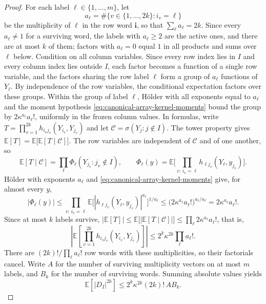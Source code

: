 \documentclass[11pt,reqno]{amsart}
\numberwithin{equation}{section}
\theoremstyle{plain}
\theoremstyle{definition}
\newcommand{\E}{\mathbb E}
\begin{document}
\begin{proof}
For each label $\ell\in\{1,\ldots,m\}$, let
\begin{equation}
 a_\ell=\#\{v\in\{1,\ldots,2k\}:i_v=\ell\}
 \label{eq:row-multiplicity}
\end{equation}
be the multiplicity of $\ell$ in the row word $\mathbf i$, so that $\sum_\ell a_\ell=2k$.  Since every $a_\ell\ne1$ for a surviving word, the labels with $a_\ell\ge2$ are the active ones, and there are at most $k$ of them; factors with $a_\ell=0$ equal $1$ in all products and sums over $\ell$ below.  Condition on all column variables.  Since every row index lies in $I$ and every column index lies outside $I$, each factor becomes a function of a single row variable, and the factors sharing the row label $\ell$ form a group of $a_\ell$ functions of $Y_\ell$.  By independence of the row variables, the conditional expectation factors over these groups.  Within the group of label $\ell$, H\"older with all exponents equal to $a_\ell$ and the moment hypothesis \eqref{eq:canonical-array-kernel-moments} bound the group by $2\kappa^{a_\ell}a_\ell!$, uniformly in the frozen column values.  In formulas, write $T=\prod_{v=1}^{2k}h_{i_vj_v}(Y_{i_v},Y_{j_v})$ and let $\mathcal C=\sigma(Y_j:j\notin I)$.  The tower property gives $\E[T]=\E\big[\E[T\mid\mathcal C]\big]$.  The row variables are independent of $\mathcal C$ and of one another, so
\begin{equation}
 \E[T\mid\mathcal C]
 =\prod_\ell\Phi_\ell(Y_{j_v}:j_v\notin I),
 \qquad
 \Phi_\ell(y)=\E\Big[\prod_{v:\,i_v=\ell}h_{\ell j_v}(Y_\ell,y_{j_v})\Big].
 \label{eq:array-conditional-factor}
\end{equation}
Hölder with exponents $a_\ell$ and \eqref{eq:canonical-array-kernel-moments} give, for almost every $y$,
\begin{equation}
 |\Phi_\ell(y)|
 \le\prod_{v:\,i_v=\ell}\E\big[|h_{\ell j_v}(Y_\ell,y_{j_v})|^{a_\ell}\big]^{1/a_\ell}
 \le\big(2\kappa^{a_\ell}a_\ell!\big)^{a_\ell/a_\ell}
 =2\kappa^{a_\ell}a_\ell!.
 \label{eq:array-holder-group}
\end{equation}
Since at most $k$ labels survive, $|\E[T]|\le\E\big[|\E[T\mid\mathcal C]|\big]\le\prod_\ell2\kappa^{a_\ell}a_\ell!$, that is,
\begin{equation}
 \left|\E\left[\prod_{v=1}^{2k}
 h_{i_vj_v}(Y_{i_v},Y_{j_v})\right]\right|
 \le 2^k\kappa^{2k}\prod_\ell a_\ell!.
 \label{eq:array-word-moment}
\end{equation}
There are $(2k)!/\prod_\ell a_\ell!$ row words with these multiplicities, so their factorials cancel.  Write $A$ for the number of surviving multiplicity vectors on at most $m$ labels, and $B_k$ for the number of surviving words.  Summing absolute values yields
\begin{equation}
 \E[|D_I|^{2k}]\le2^k\kappa^{2k}(2k)!\,A B_k.
 \label{eq:array-count-reduction}
\end{equation}


\end{proof}
\end{document}
